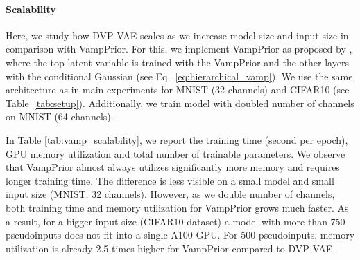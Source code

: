 \paragraph{Scalability}
Here, we study how DVP-VAE scales as we increase model size and input size in comparison with VampPrior.
For this, we implement VampPrior as proposed by \cite{tomczak2018vae}, where the top latent variable is trained with the VampPrior and the other layers with the conditional Gaussian (see Eq.~\ref{eq:hierarchical_vamp}).
 We use the same architecture as in main experiments for MNIST (32 channels) and CIFAR10 (see Table~\ref{tab:setup}). Additionally, we train model with doubled number of channels on MNIST (64 channels).

In Table \ref{tab:vamp_scalability}, we report the training time (second per epoch), GPU memory utilization and total number of trainable parameters. 
We observe that VampPrior almost always utilizes significantly more memory and requires longer training time. The difference is less visible on a small model and small input size (MNIST, 32 channels). However, as we double number of channels, both training time and memory utilization for VampPrior grows much faster. As a result, for a bigger input size (CIFAR10 dataset) a model with more than 750 pseudoinputs does not fit into a single A100 GPU. For 500 pseudoinputs, memory utilization is already 2.5 times higher for VampPrior compared to DVP-VAE.








